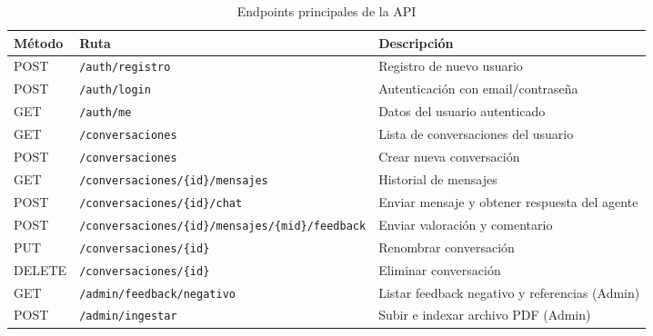 \documentclass[12pt,a4paper,oneside]{report}
\begin{document}
\begin{table}[H]
    \centering
    \caption{Endpoints principales de la API}
    \begin{tabular}{@{}lp{5.3cm}p{7.5cm}@{}}
        \toprule
        \textbf{Método} & \textbf{Ruta}                                   & \textbf{Descripción}                          \\
        \midrule
        POST            & \texttt{/auth/registro}                          & Registro de nuevo usuario                     \\
        POST            & \texttt{/auth/login}                             & Autenticación con email/contraseña            \\
        GET             & \texttt{/auth/me}                                & Datos del usuario autenticado                 \\
        GET             & \texttt{/conversaciones}                         & Lista de conversaciones del usuario           \\
        POST            & \texttt{/conversaciones}                         & Crear nueva conversación                      \\
        GET             & \texttt{/conversaciones/\allowbreak\{\allowbreak{}id\}/\allowbreak{}mensajes} & Historial de mensajes                         \\
        POST            & \texttt{/conversaciones/\allowbreak\{\allowbreak{}id\}/\allowbreak{}chat}     & Enviar mensaje y obtener respuesta del agente \\
        POST            & \texttt{/conversaciones/\allowbreak\{\allowbreak{}id\}/\allowbreak{}mensajes/\allowbreak\{\allowbreak{}mid\}/\allowbreak{}feedback} & Enviar valoración y comentario         \\
        PUT             & \texttt{/conversaciones/\allowbreak\{\allowbreak{}id\}}                          & Renombrar conversación                        \\
        DELETE          & \texttt{/conversaciones/\allowbreak\{\allowbreak{}id\}}                          & Eliminar conversación                         \\
        GET             & \texttt{/admin/\allowbreak{}feedback/\allowbreak{}negativo}                      & Listar feedback negativo y referencias (Admin)      \\
        POST            & \texttt{/admin/ingestar}                         & Subir e indexar archivo PDF (Admin)           \\

\end{tabular}
\end{table}
\end{document}
